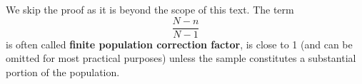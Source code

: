 \documentclass[twoside]{book}
\begin{document}
We skip the proof as it is beyond the scope of this text. The term $$\frac{N-n}{N-1}$$ is often called \textbf{finite population correction factor}, is close to 1 (and can be omitted for most practical purposes) unless the sample constitutes a substantial portion
of the population.




\end{document}
